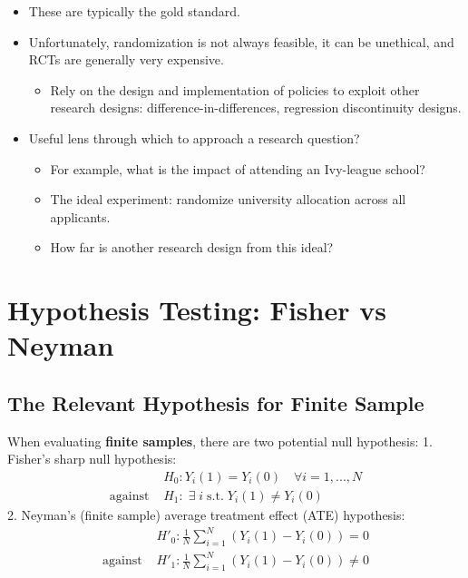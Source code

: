 \documentclass[
  letterpaper,
  DIV=11,
  numbers=noendperiod]{scrreprt}
\providecommand{\tightlist}{%
  \setlength{\itemsep}{0pt}\setlength{\parskip}{0pt}}\usepackage{longtable,booktabs,array}
\theoremstyle{definition}
\theoremstyle{remark}
\begin{document}
\begin{itemize}
\tightlist
\item
  These are typically the gold standard.
\item
  Unfortunately, randomization is not always feasible, it can be
  unethical, and RCTs are generally very expensive.

  \begin{itemize}
  \tightlist
  \item
    Rely on the design and implementation of policies to exploit other
    research designs: difference-in-differences, regression
    discontinuity designs.
  \end{itemize}
\item
  Useful lens through which to approach a research question?

  \begin{itemize}
  \tightlist
  \item
    For example, what is the impact of attending an Ivy-league school?
  \item
    The ideal experiment: randomize university allocation across all
    applicants.
  \item
    How far is another research design from this ideal?
  \end{itemize}
\end{itemize}

\hypertarget{hypothesis-testing-fisher-vs-neyman}{%
\section{Hypothesis Testing: Fisher vs
Neyman}\label{hypothesis-testing-fisher-vs-neyman}}

\hypertarget{the-relevant-hypothesis-for-finite-sample}{%
\subsection{The Relevant Hypothesis for Finite
Sample}\label{the-relevant-hypothesis-for-finite-sample}}

When evaluating \textbf{finite samples}, there are two potential null
hypothesis: 1. Fisher's sharp null hypothesis: \[
            \begin{align*}
                &H_0: Y_i(1)=Y_i(0) \quad\forall i=1,...,N \\
                \text{against }&H_1:\;\exists\;i\; \text{s.t.}\;Y_i(1)\neq Y_i(0)
            \end{align*}
            \] 2. Neyman's (finite sample) average treatment effect
(ATE) hypothesis: \[
            \begin{align*}
                &H'_0: \frac{1}{N}\sum_{i=1}^{N}(Y_i(1)-Y_i(0))=0 \\
                \text{against }&H'_1:\frac{1}{N}\sum_{i=1}^{N}(Y_i(1)-Y_i(0))\neq0
        \end{align*}
          \]
\end{document}
